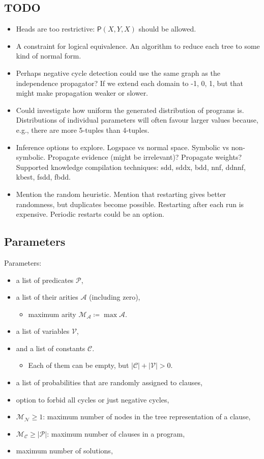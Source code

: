 \documentclass[runningheads]{llncs}
\newcommand{\predicates}{\mathcal{P}}
\newcommand{\variables}{\mathcal{V}}
\newcommand{\constants}{\mathcal{C}}
\newcommand{\arities}{\mathcal{A}}
\newcommand{\maxArity}{\mathcal{M}_{\mathcal{A}}}
\newcommand{\maxNumNodes}{\mathcal{M}_{\mathcal{N}}}
\newcommand{\maxNumClauses}{\mathcal{M}_{\mathcal{C}}}
\begin{document}
\subsection{TODO}

\begin{itemize}
\item Heads are too restrictive: $\mathsf{P}(X, Y, X)$ should be allowed.
\item A constraint for logical equivalence. An algorithm to reduce each tree to
  some kind of normal form.
\item Perhaps negative cycle detection could use the same graph as the
  independence propagator? If we extend each domain to {-1, 0, 1}, but that
  might make propagation weaker or slower.
\item Could investigate how uniform the generated distribution of programs is.
  Distributions of individual parameters will often favour larger values
  because, e.g., there are more 5-tuples than 4-tuples.
\item Inference options to explore. Logspace vs normal space. Symbolic vs
  non-symbolic. Propagate evidence (might be irrelevant)? Propagate weights?
  Supported knowledge compilation techniques: sdd, sddx, bdd, nnf, ddnnf, kbest,
  fsdd, fbdd.
\item Mention the random heuristic. Mention that restarting gives better
  randomness, but duplicates become possible. Restarting after each run is
  expensive. Periodic restarts could be an option.
\end{itemize}

\subsection{Parameters}

Parameters:
\begin{itemize}
\item a list of predicates $\predicates{}$,
\item a list of their arities $\arities{}$ (including zero),
  \begin{itemize}
  \item maximum arity $\maxArity{} \coloneqq \max \arities{}$.
  \end{itemize}
\item a list of variables $\variables{}$,
\item and a list of constants $\constants{}$.
  \begin{itemize}
  \item Each of them can be empty, but $|\constants{}| + |\variables{}| > 0$.
  \end{itemize}
\item a list of probabilities that are randomly assigned to clauses,
\item option to forbid all cycles or just negative cycles,
\item $\maxNumNodes{} \ge 1$: maximum number of nodes in the tree representation
  of a clause,
\item $\maxNumClauses{} \ge |\predicates{}|$: maximum number of clauses in a
  program,
\item maximum number of solutions,
\end{itemize}
\end{document}
